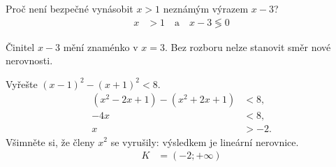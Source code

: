 \documentclass[11pt,a4paper]{article}
\begin{document}
\begin{zadaniReseniBox}[title={Samostatná práce 4}]
Proč není bezpečné vynásobit $x>1$ neznámým výrazem $x-3$?
\tcblower
\[
\begin{aligned}
x&>1\quad\text{a}\quad x-3\lessgtr0
\end{aligned}
\]

Činitel $x-3$ mění znaménko v $x=3$. Bez rozboru nelze stanovit směr nové nerovnosti.
\end{zadaniReseniBox}
\begin{zadaniReseniBox}[title={Rozšíření 1}]
Vyřešte $(x-1)^2-(x+1)^2<8$.
\tcblower
\[
\begin{aligned}
(x^2-2x+1)-(x^2+2x+1)&<8,\\
-4x&<8,\\
x&>-2.
\end{aligned}
\]
Všimněte si, že členy $x^2$ se vyrušily: výsledkem je lineární nerovnice.
\[
\begin{aligned}
K &= (-2;+\infty)
\end{aligned}
\]
\end{zadaniReseniBox}
\end{document}
